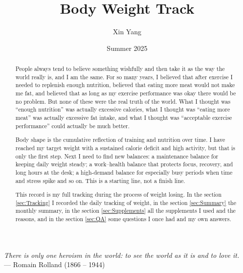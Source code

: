 \documentclass{article}
\title{Body Weight Track}
\author{Xin Yang}
\date{Summer 2025}
\begin{document}
\maketitle

\noindent\textit{There is only one heroism in the world: to see the world as it is and to love it.} \\
— Romain Rolland (1866 -- 1944)

\begin{abstract}
People always tend to believe something wishfully and then take it as the way the world really is, and I am the same. For so many years, I believed that after exercise I needed to replenish enough nutrition, believed that eating more meat would not make me fat, and believed that as long as my exercise performance was okay there would be no problem. But none of these were the real truth of the world. What I thought was “enough nutrition” was actually excessive calories, what I thought was “eating more meat” was actually excessive fat intake, and what I thought was “acceptable exercise performance” could actually be much better.

Body shape is the cumulative reflection of training and nutrition over time. I have reached my target weight with a sustained calorie deficit and high activity, but that is only the first step. Next I need to find new balances: a maintenance balance for keeping daily weight steady; a work–health balance that protects focus, recovery, and long hours at the desk; a high-demand balance for especially busy periods when time and stress spike and so on. This is a starting line, not a finish line.

This record is my full tracking during the process of  weight losing. In the section \ref{sec:Tracking} I recorded the daily tracking of weight, in the section \ref{sec:Summary} the monthly summary, in the section \ref{sec:Supplements} all the supplements I used and the reasons, and in the section \ref{sec:QA} some questions I once had and my own answers.
\end{abstract}
\end{document}
